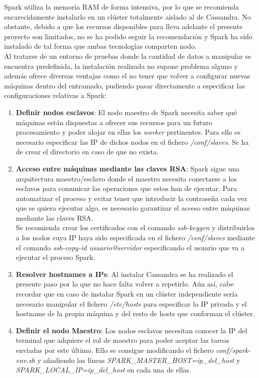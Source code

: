 Spark utiliza la memoria RAM de forma intensiva, por lo que se recomienda encarecidamente instalarlo en un clúster totalmente aislado al de Cassandra. No obstante, debido a que los recursos disponibles para lleva adelante el presente proyecto son limitados, no se ha podido seguir la recomendación y Spark ha sido instalado de tal forma que ambas tecnologías comparten nodo.\\

Al tratarse de un entorno de pruebas donde la cantidad de datos a manipular se encuentra predefinida, la instalación realizada no supone problema alguno y además ofrece diversas ventajas como el no tener que volver a configurar nuevas máquinas dentro del entramado, pudiendo pasar directamente a especificar las configuraciones relativas a Spark:

\clearpage

\begin{enumerate}
	
\item \textbf{Definir nodos esclavos}: El nodo maestro de Spark necesita saber qué máquinas están dispuestas a ofrecer sus recursos para un futuro procesamiento y poder alojar en ellas los \textit{worker} pertinentes. Para ello es necesario especificar las IP de dichos nodos en el fichero \textit{/conf/slaves}. Se ha de crear el directorio en caso de que no exista.

\item \textbf{Acceso entre máquinas mediante las claves RSA}: Spark sigue una arquitectura maestro/esclavo donde el maestro necesita conectarse a los esclavos para comunicar las operaciones que estos han de ejecutar. Para automatizar el proceso y evitar tener que introducir la contraseña cada vez que se quiera ejecutar algo, es necesario garantizar el acceso entre máquinas mediante las claves RSA.\\

Se recomienda crear los certificados con el comando \textit{ssh-keygen} y distribuirlos a los nodos cuya IP haya sido especificada en el fichero \textit{/conf/slaves} mediante el comando \textit{ssh-copy-id {usuario}@{servidor}} especificando el usuario que va a ejecutar el proceso Spark.

\item \textbf{Resolver hostnames a IPs}: Al instalar Cassandra se ha realizado el presente paso por lo que no hace falta volver a repetirlo. Aún así, cabe recordar que en caso de instalar Spark en un clúster independiente sería necesario manipular el fichero \textit{/etc/hosts} para especificar la IP privada y el hostname de la propia máquina y del resto de hosts que conforman el clúster.

\item \textbf{Definir el nodo Maestro}: Los nodos esclavos necesitan conocer la IP del terminal que adquiere el rol de maestro para poder aceptar las tareas enviadas por este último. Ello se consigue modificando  el fichero \textit{conf/spark-env.sh} y añadiendo las líneas \textit{SPARK\_MASTER\_HOST=ip\_del\_host} y \textit{SPARK\_LOCAL\_IP=ip\_del\_host} en cada una de ellas.
	
\end{enumerate}

